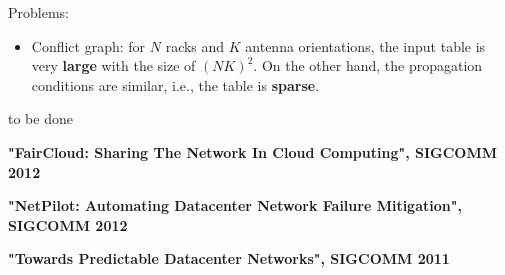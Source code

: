 \documentclass[journal,onecolumn,11pt]{IEEEtran}
\begin{document}
Problems:
\begin{itemize}
  \item Conflict graph: for $N$ racks and $K$ antenna orientations, the input table is very \textbf{large} with the size of $(NK)^2$. On the other hand, the propagation conditions are similar, i.e., the table is \textbf{sparse}.
\end{itemize}

to be done

\textbf{"FairCloud: Sharing The Network In Cloud Computing", SIGCOMM 2012}

\textbf{"NetPilot: Automating Datacenter Network Failure Mitigation", SIGCOMM 2012}

\textbf{"Towards Predictable Datacenter Networks", SIGCOMM 2011}

\renewcommand\refname{References}
%


\end{document}
